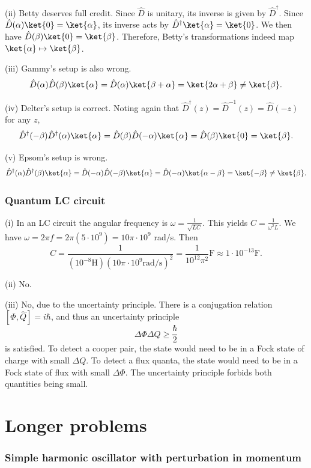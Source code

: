 \documentclass[11pt, letterpaper]{article}
\begin{document}
(ii) Betty deserves full credit. Since $\hat{D} $ is unitary, its inverse is given by $\hat{D} ^\dagger$. Since $\hat{D} (\alpha )\ket{0}=\ket{\alpha }$, its inverse acts by $\hat{D} ^\dagger\ket{\alpha }=\ket{0}$. We then have $\hat{D} (\beta )\ket{0}=\ket{\beta }$. Therefore, Betty's transformations indeed map $\ket{\alpha }\mapsto \ket{\beta }$.

(iii) Gammy's setup is also wrong.
\[
	\hat{D} (\alpha )\hat{D} (\beta )\ket{\alpha }=\hat{D} (\alpha )\ket{\beta +\alpha }=\ket{2\alpha +\beta }\neq \ket{\beta }
.\]

(iv) Delter's setup is correct. Noting again that $\hat{D} ^\dagger(z ) = \hat{D} ^{-1} (z)=\hat{D} (-z)$ for any $z$,
\[
	\hat{D} ^\dagger(-\beta )\hat{D} ^\dagger(\alpha )\ket{\alpha }=\hat{D} (\beta )\hat{D} (-\alpha )\ket{\alpha }=\hat{D} (\beta )\ket{0}=\ket{\beta }
.\]

(v) Epsom's setup is wrong.
\[
	\hat{D} ^\dagger(\alpha )\hat{D} ^\dagger(\beta )\ket{\alpha }=\hat{D} (-\alpha )\hat{D} (-\beta )\ket{\alpha }=\hat{D} (-\alpha )\ket{\alpha -\beta }=\ket{-\beta }\neq \ket{\beta }
.\]
\section{Quantum LC circuit}
(i) In an LC circuit the angular frequency is $\omega =\frac{1}{\sqrt{LC} } $. This yields $C=\frac{1}{\omega ^2L} $. We have $\omega =2\pi f = 2\pi (5\cdot 10^9)=10\pi \cdot 10^9$ rad$/$s. Then
\[
	C=\frac{1}{\left( 10^{-8} \mathrm{H}  \right) \left( 10\pi \cdot 10^9 \mathrm{rad} /\mathrm{s}  \right)^2 } =\frac{1}{10^{12} \pi ^2} \mathrm{F} \approx 1\cdot 10^{-13} \mathrm{F} 
.\]

(ii) No.

(iii) No, due to the uncertainty principle. There is a conjugation relation $[\hat{\Phi },\hat{Q} ]=i\hbar$, and thus an uncertainty principle
\[
	\Delta \Phi \Delta Q \geq \frac{\hbar}{2} 
\]
is satisfied. To detect a cooper pair, the state would need to be in a Fock state of charge with small $\Delta Q$. To detect a flux quanta, the state would need to be in a Fock state of flux with small $\Delta \Phi $. The uncertainty principle forbids both quantities being small.
\part{Longer problems}
\section{Simple harmonic oscillator with perturbation in momentum}
\end{document}
